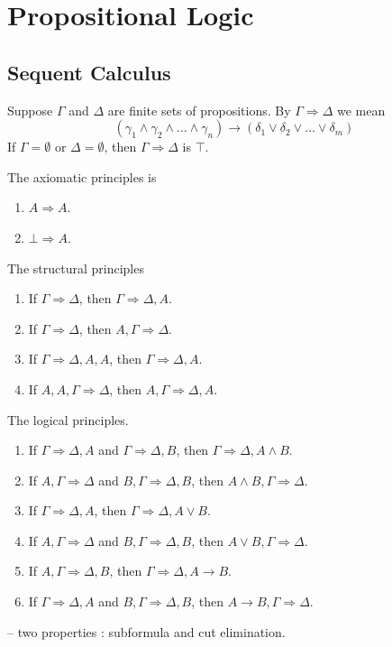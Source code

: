 \chapter{Propositional Logic}

\section{Sequent Calculus}
Suppose \(\Gamma\) and \(\Delta\) are finite sets of propositions. By \(\Gamma \Rightarrow \Delta\) we mean 
\begin{equation}
   ( \gamma_1 \land \gamma_2 \land \dots \land \gamma_n) \to (\delta_1 \lor \delta_2 \lor \dots \lor \delta_m)
\end{equation}
If \(\Gamma = \emptyset\) or \(\Delta = \emptyset\), then \(\Gamma \Rightarrow \Delta\) is \(\top\).

\begin{definition}
    The axiomatic principles is 
    \begin{enumerate}
        \item \(A \Rightarrow A\).
        \item \(\bot \Rightarrow A\).
    \end{enumerate}
    The structural principles
    \begin{enumerate}
        \item If \(\Gamma \Rightarrow \Delta\), then \(\Gamma \Rightarrow \Delta,A\).
        \item If \(\Gamma \Rightarrow \Delta\), then \(A,\Gamma \Rightarrow \Delta\).
        \item If \(\Gamma \Rightarrow \Delta,A,A\), then \(\Gamma \Rightarrow \Delta,A\).
        \item If \(A,A,\Gamma \Rightarrow \Delta\), then \(A,\Gamma \Rightarrow \Delta,A\).
    \end{enumerate}
    The logical principles.
    \begin{enumerate}
        \item If \(\Gamma \Rightarrow \Delta,A\) and \(\Gamma \Rightarrow \Delta,B\), then \(\Gamma \Rightarrow \Delta,A\land B\).
        \item If \(A,\Gamma \Rightarrow \Delta\) and \(B,\Gamma \Rightarrow \Delta,B\), then \(A\land B,\Gamma \Rightarrow \Delta\).
        \item If \(\Gamma \Rightarrow \Delta,A\), then \(\Gamma \Rightarrow \Delta,A\lor B\).
        \item If \(A,\Gamma \Rightarrow \Delta\) and \(B,\Gamma \Rightarrow \Delta,B\), then \(A\lor B,\Gamma \Rightarrow \Delta\).
        \item If \(A,\Gamma \Rightarrow \Delta,B\), then \(\Gamma \Rightarrow \Delta,A\to B\).
        \item If \(\Gamma \Rightarrow \Delta,A\) and \(B,\Gamma \Rightarrow \Delta,B\), then \(A\to B,\Gamma \Rightarrow \Delta\).
    \end{enumerate}
    
\end{definition}

-- two properties : subformula and cut elimination.